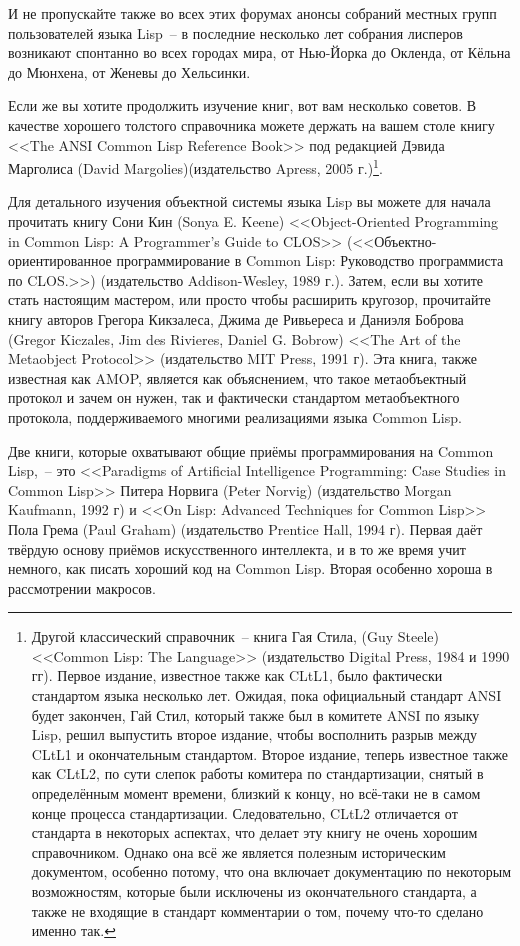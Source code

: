 И не пропускайте также во всех этих форумах анонсы собраний местных групп пользователей
языка Lisp~-- в последние несколько лет собрания лисперов возникают спонтанно во всех
городах мира, от Нью-Йорка до Окленда, от Кёльна до Мюнхена, от Женевы до Хельсинки.

Если же вы хотите продолжить изучение книг, вот вам несколько советов. В качестве хорошего
толстого справочника можете держать на вашем столе книгу <<The ANSI Common Lisp Reference
Book>> под редакцией Дэвида Марголиса (David Margolies)(издательство Apress, 2005
г.)\footnote{Другой классический справочник~-- книга Гая Стила, (Guy Steele) <<Common
    Lisp: The Language>> (издательство Digital Press, 1984 и 1990 гг). Первое издание,
    известное также как CLtL1, было фактически стандартом языка несколько лет. Ожидая,
    пока официальный стандарт ANSI будет закончен, Гай Стил, который также был в комитете
    ANSI по языку Lisp, решил выпустить второе издание, чтобы восполнить разрыв между
    CLtL1 и окончательным стандартом. Второе издание, теперь известное также как CLtL2, по
    сути слепок работы комитера по стандартизации, снятый в определённым момент времени,
    близкий к концу, но всё-таки не в самом конце процесса стандартизации. Следовательно,
    CLtL2 отличается от стандарта в некоторых аспектах, что делает эту книгу не очень
    хорошим справочником. Однако она всё же является полезным историческим документом,
    особенно потому, что она включает документацию по некоторым возможностям, которые были
    исключены из окончательного стандарта, а также не входящие в стандарт комментарии о
    том, почему что-то сделано именно так.}.

Для детального изучения объектной системы языка Lisp вы можете для начала прочитать книгу
Сони Кин (Sonya E. Keene) <<Object-Oriented Programming in Common Lisp: A Programmer's
Guide to CLOS>> (<<Объектно-ориентированное программирование в Common Lisp: Руководство
программиста по CLOS.>>) (издательство Addison-Wesley, 1989 г.). Затем, если вы хотите
стать настоящим мастером, или просто чтобы расширить кругозор, прочитайте книгу авторов
Грегора Кикзалеса, Джима де Ривьереса и Даниэля Боброва (Gregor Kiczales, Jim des
Rivieres, Daniel G. Bobrow) <<The Art of the Metaobject Protocol>> (издательство MIT
Press, 1991 г). Эта книга, также известная как AMOP, является как объяснением, что такое
метаобъектный протокол и зачем он нужен, так и фактически стандартом метаобъектного
протокола, поддерживаемого многими реализациями языка Common Lisp.

Две книги, которые охватывают общие приёмы программирования на Common Lisp,~-- это
<<Paradigms of Artificial Intelligence Programming: Case Studies in Common Lisp>> Питера
Норвига (Peter Norvig) (издательство Morgan Kaufmann, 1992 г) и <<On Lisp: Advanced
Techniques for Common Lisp>> Пола Грема (Paul Graham) (издательство Prentice Hall, 1994
г). Первая даёт твёрдую основу приёмов искусственного интеллекта, и в то же время учит
немного, как писать хороший код на Common Lisp. Вторая особенно хороша в рассмотрении
макросов.

